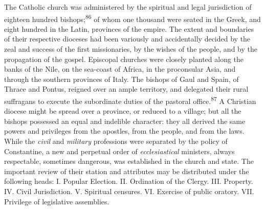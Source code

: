 
The Catholic church was administered by the spiritual and legal
jurisdiction of eighteen hundred bishops;\textsuperscript{86} of whom one thousand were
seated in the Greek, and eight hundred in the Latin, provinces of the
empire. The extent and boundaries of their respective dioceses had been
variously and accidentally decided by the zeal and success of the first
missionaries, by the wishes of the people, and by the propagation of
the gospel. Episcopal churches were closely planted along the banks of
the Nile, on the sea-coast of Africa, in the proconsular Asia, and
through the southern provinces of Italy. The bishops of Gaul and Spain,
of Thrace and Pontus, reigned over an ample territory, and delegated
their rural suffragans to execute the subordinate duties of the
pastoral office.\textsuperscript{87} A Christian diocese might be spread over a
province, or reduced to a village; but all the bishops possessed an
equal and indelible character: they all derived the same powers and
privileges from the apostles, from the people, and from the laws. While
the \textit{civil} and \textit{military} professions were separated by the policy of
Constantine, a new and perpetual order of \textit{ecclesiastical} ministers,
always respectable, sometimes dangerous, was established in the church
and state. The important review of their station and attributes may be
distributed under the following heads: I. Popular Election. II.
Ordination of the Clergy. III. Property. IV. Civil Jurisdiction. V.
Spiritual censures. VI. Exercise of public oratory. VII. Privilege of
legislative assemblies.



